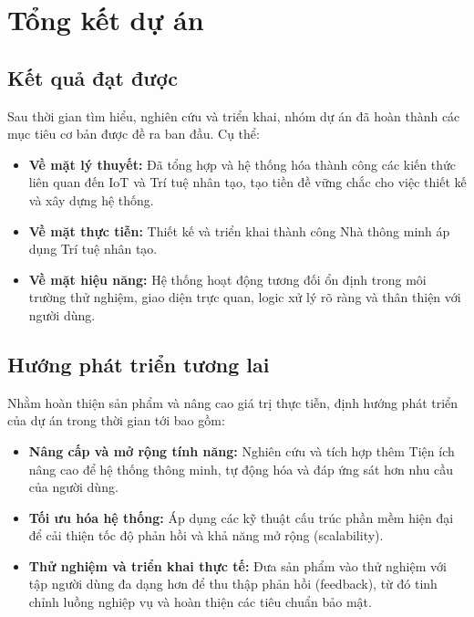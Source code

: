 \section{Tổng kết dự án}

\subsection{Kết quả đạt được}
Sau thời gian tìm hiểu, nghiên cứu và triển khai, nhóm dự án đã hoàn thành các mục tiêu cơ bản được đề ra ban đầu. Cụ thể:
\begin{itemize}
    \item \textbf{Về mặt lý thuyết:} Đã tổng hợp và hệ thống hóa thành công các kiến thức liên quan đến IoT và Trí tuệ nhân tạo, tạo tiền đề vững chắc cho việc thiết kế và xây dựng hệ thống.
    \item \textbf{Về mặt thực tiễn:} Thiết kế và triển khai thành công Nhà thông minh áp dụng Trí tuệ nhân tạo.
    \item \textbf{Về mặt hiệu năng:} Hệ thống hoạt động tương đối ổn định trong môi trường thử nghiệm, giao diện trực quan, logic xử lý rõ ràng và thân thiện với người dùng.
\end{itemize}

\subsection{Hướng phát triển tương lai}
Nhằm hoàn thiện sản phẩm và nâng cao giá trị thực tiễn, định hướng phát triển của dự án trong thời gian tới bao gồm:
\begin{itemize}
    \item \textbf{Nâng cấp và mở rộng tính năng:} Nghiên cứu và tích hợp thêm Tiện ích nâng cao để hệ thống thông minh, tự động hóa và đáp ứng sát hơn nhu cầu của người dùng.
    \item \textbf{Tối ưu hóa hệ thống:} Áp dụng các kỹ thuật cấu trúc phần mềm hiện đại để cải thiện tốc độ phản hồi và khả năng mở rộng (scalability).
    \item \textbf{Thử nghiệm và triển khai thực tế:} Đưa sản phẩm vào thử nghiệm với tập người dùng đa dạng hơn để thu thập phản hồi (feedback), từ đó tinh chỉnh luồng nghiệp vụ và hoàn thiện các tiêu chuẩn bảo mật.
\end{itemize}